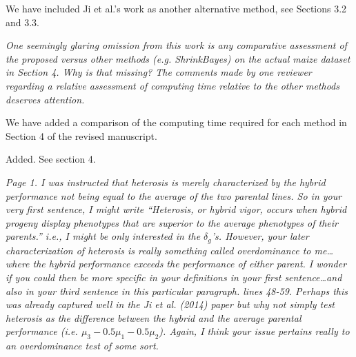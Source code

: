\documentclass{article}
\newcommand{\comment}[1]{\textit{#1}}
\newcommand{\response}[1]{#1}
\begin{document}
\response{We have included Ji et al.'s work as another alternative method, see Sections 3.2 and 3.3.} 

\comment{One seemingly glaring omission from this work is any comparative assessment of the proposed versus other methods (e.g. ShrinkBayes) on the actual maize dataset in Section 4.  Why is that missing? The comments made by one reviewer regarding a relative assessment of computing time relative to the other methods deserves attention.}

\response{We have added a comparison of the computing time required for each method in Section 4 of the revised manuscript.}

\response{Added. See section 4.}

\comment{Page 1.  I was instructed that heterosis is merely characterized by the hybrid performance not being equal to the average of the two parental lines.  So in your very first sentence, I might write “Heterosis, or hybrid vigor, occurs when hybrid progeny display phenotypes that are superior to the average phenotypes of their parents.” i.e., I might be only interested in the $\delta_g$’s. However, your later characterization of heterosis is really something called overdominance to me…where the hybrid performance exceeds the performance of either parent.  I wonder if you could then be more specific in your definitions in your first sentence…and also in your third sentence in this particular paragraph. lines 48-59.  Perhaps this was already captured well in the Ji et al. (2014) paper but why not simply test heterosis as the difference between the hybrid and the average parental performance (i.e. $\mu_3 - 0.5 \mu_1 - 0.5 \mu_2$).  Again, I think your issue pertains really to an overdominance test of some sort.}
\end{document}
